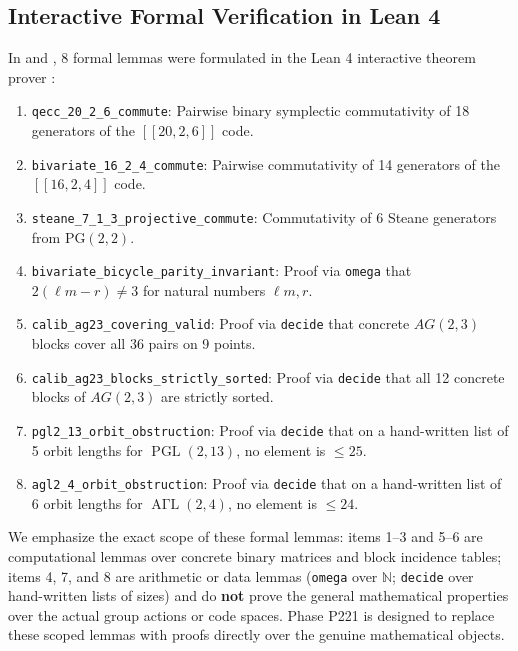 \documentclass[11pt,a4paper]{article}
\begin{document}
\subsection{Interactive Formal Verification in Lean 4}
\label{sec:lean4}
In  and , 8 formal lemmas were formulated in the Lean 4 interactive theorem prover \cite{moura2021lean4}:
\begin{enumerate}
    \item \texttt{qecc\_20\_2\_6\_commute}: Pairwise binary symplectic commutativity of 18 generators of the $[[20, 2, 6]]$ code.
    \item \texttt{bivariate\_16\_2\_4\_commute}: Pairwise commutativity of 14 generators of the $[[16, 2, 4]]$ code.
    \item \texttt{steane\_7\_1\_3\_projective\_commute}: Commutativity of 6 Steane generators from $\text{PG}(2, 2)$.
    \item \texttt{bivariate\_bicycle\_parity\_invariant}: Proof via \texttt{omega} that $2(\ell m - r) \ne 3$ for natural numbers $\ell m, r$.
    \item \texttt{calib\_ag23\_covering\_valid}: Proof via \texttt{decide} that concrete $AG(2, 3)$ blocks cover all 36 pairs on 9 points.
    \item \texttt{calib\_ag23\_blocks\_strictly\_sorted}: Proof via \texttt{decide} that all 12 concrete blocks of $AG(2, 3)$ are strictly sorted.
    \item \texttt{pgl2\_13\_orbit\_obstruction}: Proof via \texttt{decide} that on a hand-written list of 5 orbit lengths for $\operatorname{PGL}(2, 13)$, no element is $\le 25$.
    \item \texttt{agl2\_4\_orbit\_obstruction}: Proof via \texttt{decide} that on a hand-written list of 6 orbit lengths for $\operatorname{A\Gamma L}(2, 4)$, no element is $\le 24$.
\end{enumerate}
We emphasize the exact scope of these formal lemmas: items 1--3 and 5--6 are computational lemmas over concrete binary matrices and block incidence tables; items 4, 7, and 8 are arithmetic or data lemmas (\texttt{omega} over $\mathbb{N}$; \texttt{decide} over hand-written lists of sizes) and do \textbf{not} prove the general mathematical properties over the actual group actions or code spaces. Phase P221 is designed to replace these scoped lemmas with proofs directly over the genuine mathematical objects.
\end{document}
